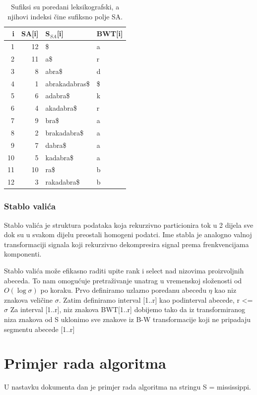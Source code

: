 \documentclass[a4paper,12pt]{article}
\begin{document}
\begin{table}
	\caption{Sufiksi su poredani leksikografski, a njihovi indeksi čine sufiksno polje SA.}
	\label{tablePrimjer2}
	\begin{center}
		\begin{tabular}{rrll}
			\toprule
			i & SA[i] & S$_{SA}$[i] & BWT[i] \\
			\midrule
			1 & 12 & \$ & a\\
			2 & 11 &  a\$ & r \\
			3 & 8 & abra\$ & d \\
			4 & 1 & abrakadabras\$ & \$ \\
			5 & 6 & adabra\$ & k \\
			6 & 4 & akadabra\$ & r \\
			7 & 9 & bra\$ & a\\
			8 & 2 & brakadabra\$ & a\\
			9 & 7 & dabra\$ & a \\
			10 & 5 & kadabra\$ & a\\
			11 & 10 & ra\$ & b \\
			12 & 3 & rakadabra\$ & b\\
			\bottomrule
		\end{tabular}
	\end{center}
\end{table}

\newpage

\subsubsection{Stablo valića}
\label{WT_definicija}

Stablo valića je struktura podataka koja rekurzivno particionira tok u 2 dijela sve dok su u svakom dijelu preostali homogeni podatci. Ime stabla je analogno valnoj transformaciji signala koji rekurzivno dekompresira signal prema frenkvencijama komponenti. 

Stablo valića može efikasno raditi upite rank i select nad nizovima proizvoljnih abeceda. To nam omogućuje pretraživanje unatrag u vremenskoj složenosti od  $O(\log\sigma)$ po koraku.
Prvo definiramo uzlazno poredanu abecedu $\eta$ kao niz znakova veličine $\sigma $.  
Zatim definiramo interval [1..r] kao podinterval abecede, r <= $\sigma$
Za interval [1..r], niz znakova BWT[1..r] dobijemo tako da iz transformiranog niza znakova od S uklonimo sve znakove iz B-W transformacije koji ne pripadaju segmentu abecede [1..r]

\section{Primjer rada algoritma}
U nastavku dokumenta dan je primjer rada algoritma na stringu S = mississippi.
\end{document}
